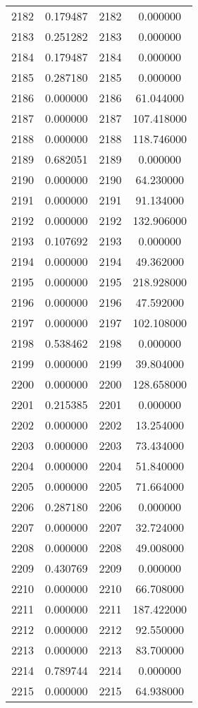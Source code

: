 \documentclass[12pt]{article}
\begin{document}
\begin{longtable}{@{}cccc@{}}
2182 & 0.179487 & 2182 & 0.000000 \\
2183 & 0.251282 & 2183 & 0.000000 \\
2184 & 0.179487 & 2184 & 0.000000 \\
2185 & 0.287180 & 2185 & 0.000000 \\
2186 & 0.000000 & 2186 & 61.044000 \\
2187 & 0.000000 & 2187 & 107.418000 \\
2188 & 0.000000 & 2188 & 118.746000 \\
2189 & 0.682051 & 2189 & 0.000000 \\
2190 & 0.000000 & 2190 & 64.230000 \\
2191 & 0.000000 & 2191 & 91.134000 \\
2192 & 0.000000 & 2192 & 132.906000 \\
2193 & 0.107692 & 2193 & 0.000000 \\
2194 & 0.000000 & 2194 & 49.362000 \\
2195 & 0.000000 & 2195 & 218.928000 \\
2196 & 0.000000 & 2196 & 47.592000 \\
2197 & 0.000000 & 2197 & 102.108000 \\
2198 & 0.538462 & 2198 & 0.000000 \\
2199 & 0.000000 & 2199 & 39.804000 \\
2200 & 0.000000 & 2200 & 128.658000 \\
2201 & 0.215385 & 2201 & 0.000000 \\
2202 & 0.000000 & 2202 & 13.254000 \\
2203 & 0.000000 & 2203 & 73.434000 \\
2204 & 0.000000 & 2204 & 51.840000 \\
2205 & 0.000000 & 2205 & 71.664000 \\
2206 & 0.287180 & 2206 & 0.000000 \\
2207 & 0.000000 & 2207 & 32.724000 \\
2208 & 0.000000 & 2208 & 49.008000 \\
2209 & 0.430769 & 2209 & 0.000000 \\
2210 & 0.000000 & 2210 & 66.708000 \\
2211 & 0.000000 & 2211 & 187.422000 \\
2212 & 0.000000 & 2212 & 92.550000 \\
2213 & 0.000000 & 2213 & 83.700000 \\
2214 & 0.789744 & 2214 & 0.000000 \\
2215 & 0.000000 & 2215 & 64.938000 \\

\end{longtable}
\end{document}
